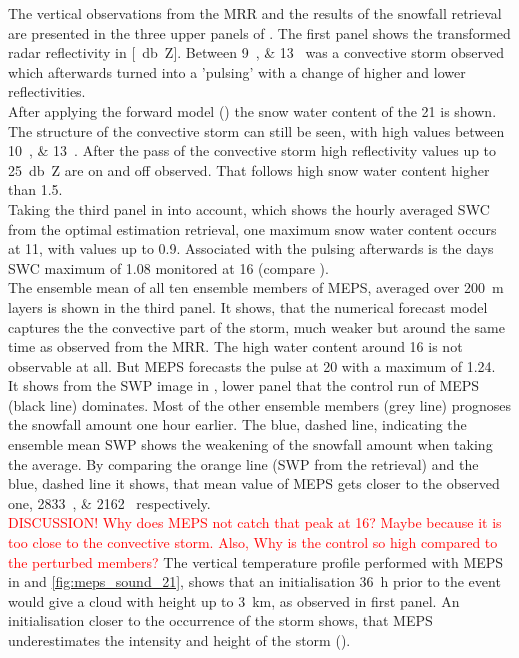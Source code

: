 The vertical observations from the MRR and the results of the snowfall retrieval are presented in the three upper panels of . The first panel shows the transformed radar reflectivity in [\SI{}{\decibel Z}]. Between \SIlist{9;13}{\UTC} was a convective storm observed which afterwards turned into a 'pulsing' with a change of higher and lower reflectivities. 
\\
After applying the forward model () the snow water content of the \SI{21}{\dec} is shown. The structure of the convective storm can still be seen, with high values between \SIlist{10;13}{\UTC}. After the pass of the convective storm high reflectivity values up to \SI{25}{\decibel Z} are on and off observed. That follows high snow water content higher than \SI{1.5}{\SWC}. \\
Taking the third panel in  into account, which shows the hourly averaged SWC from the optimal estimation retrieval, one maximum snow water content occurs at \SI{11}{\UTC}, with values up to \SI{0.9}{\SWC}. Associated with the pulsing afterwards is the days SWC maximum of \SI{1.08}{\SWC} monitored at \SI{16}{\UTC} (compare ). 
\\
The ensemble mean of all ten ensemble members of MEPS, averaged over \SI{200}{\metre} layers is shown in the third panel. It shows, that the numerical forecast model captures the the convective part of the storm, much weaker but around the same time as observed from the MRR. The high water content around \SI{16}{\UTC} is not observable at all. But MEPS forecasts the pulse at \SI{20}{\UTC} with a maximum of \SI{1.24}{\SWC}.
\\
It shows from the SWP image in , lower panel that the control run of MEPS (black line) dominates. Most of the other ensemble members (grey line) prognoses the snowfall amount one hour earlier. The blue, dashed line, indicating the ensemble mean SWP shows the weakening of the snowfall amount when taking the average. By comparing the orange line (SWP from the retrieval) and the blue, dashed line it shows, that mean value of MEPS gets closer to the observed one, \SIlist{2833; 2162}{\SWP} respectively.
\\
\textcolor{red}{DISCUSSION! Why does MEPS not catch that peak at \SI{16}{\UTC}? Maybe because it is too close to the convective storm. Also, Why is the control so high compared to the perturbed members?}
%
\newline \noindent
The vertical temperature profile performed with MEPS in  and \ref{fig:meps_sound_21}, shows that an initialisation \SI{36}{\hour} prior to the event would give a cloud with height up to \SI{3}{\km}, as observed in  first panel. An initialisation closer to the occurrence of the storm shows, that MEPS underestimates the intensity and height of the storm ().

